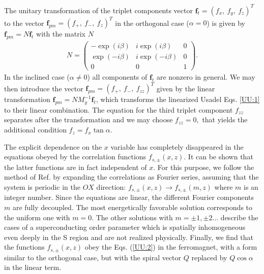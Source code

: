 \documentclass[prb,amsmath,amssymb,reprint]{revtex4-2}
\begin{document}
The unitary transformation of the triplet components vector $\mathbf{f}_{t}=(f_{x},~f_{y},~f_{z})^{T}$ to the vector $\mathbf{f}_{pm}=(f_{+},~f_{-},~f_{z})^{T}$ in the orthogonal case ($\alpha =0$) is given by $\mathbf{f}_{pm}=N\mathbf{f}_{t}$ with
the matrix $N$
\begin{eqnarray}
N=\left(
\begin{array}{ccc}
-\exp (i\beta ) & i\exp (i\beta ) & 0 \\
\exp (-i\beta ) & i\exp (-i\beta ) & 0 \\
0 & 0 & 1
\end{array}
\right). \label{fpm}
\end{eqnarray}
In the inclined case ($\alpha \neq 0$) all components of $\mathbf{f}_{t}$
 are nonzero in general. We may then introduce the vector $\mathbf
 {f}_{pm }=(f_{+},~f_{-},~f_{zz})^{T}$ given by the linear transformation $\mathbf{
f}_{pm }=NM_{y}^{-1} \mathbf{f}_{t}$, which transforms the linearized Usadel
Eqs. \eqref{UU:1} to their linear combination. The equation for the third triplet component $f_{zz}$ separates after the
transformation and we may choose $f_{zz}=0,$ that yields the additional
condition $f_{z}=f_{x}\tan \alpha$.

The explicit dependence on the $x$ variable has completely disappeared in the equations obeyed by the correlation functions $f_{s,\pm }(x,z)$. It can be shown that the latter functions are in fact independent of $x$. For this purpose, we follow the method of Ref.  by expanding the correlations as Fourier series, assuming that the system is periodic in the $OX$ direction: $f_{s,\pm }(x,z)\rightarrow
f_{s,\pm }(m,z)$ where $m$ is an integer number.  Since the equations are linear, the different
Fourier components $m$ are fully decoupled. The most energetically favorable
solution corresponds \cite{Champel2005} to the uniform one with $m=0$. The other solutions with $m=\pm 1,\pm
2...$ describe the cases of a superconducting order parameter which is spatially inhomogeneous even deeply in the S region
and are not realized physically. Finally, we find that the functions $f_{s,\pm }(x,z)$
obey the Eqs. (\ref{UU:2}) in the ferromagnet, with a form similar to the
orthogonal case, but  with the spiral vector $Q$ replaced by $Q\cos \alpha $ in the linear term.
\end{document}

